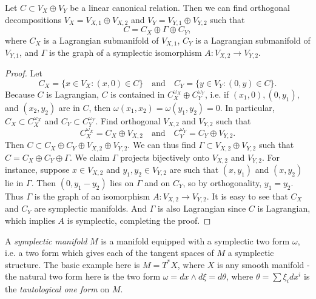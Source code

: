 \begin{lemma}
    Let $C \subset V_X \oplus V_Y$ be a linear canonical relation. Then we can find orthogonal decompositions $V_X = V_{X,1} \oplus V_{X,2}$ and $V_Y = V_{Y,1} \oplus V_{Y,2}$ such that
    \[ C = C_X \oplus \Gamma \oplus C_Y, \]
    where $C_X$ is a Lagrangian submanifold of $V_{X,1}$, $C_Y$ is a Lagrangian submanifold of $V_{Y,1}$, and $\Gamma$ is the graph of a symplectic isomorphism $A: V_{X,2} \to V_{Y,2}$.
\end{lemma}
\begin{proof}
    Let
    \[ C_X = \{ x \in V_X : (x,0) \in C \} \quad\text{and}\quad C_Y = \{ y \in V_Y : (0,y) \in C \}. \]
    Because $C$ is Lagrangian, $C$ is contained in $C_X^{\omega_X} \oplus C_Y^{\omega_Y}$, i.e. if $(x_1,0), (0,y_1)$, and $(x_2,y_2)$ are in $C$, then $\omega(x_1,x_2) = \omega(y_1,y_2) = 0$. In particular, $C_X \subset C_X^{\omega_X}$ and $C_Y \subset C_Y^{\omega_Y}$. Find orthogonal $V_{X,2}$ and $V_{Y,2}$ such that
    \[ C_X^{\omega_X} = C_X \oplus V_{X,2} \quad\text{and}\quad C_Y^{\omega_Y} = C_Y \oplus V_{Y,2}. \]
    Then $C \subset C_X \oplus C_Y \oplus V_{X,2} \oplus V_{Y,2}$. We can thus find $\Gamma \subset V_{X,2} \oplus V_{Y,2}$ such that $C = C_X \oplus C_Y \oplus \Gamma$. We claim $\Gamma$ projects bijectively onto $V_{X,2}$ and $V_{Y,2}$. For instance, suppose $x \in V_{X,2}$ and $y_1,y_2 \in V_{Y,2}$ are such that $(x,y_1)$ and $(x,y_2)$ lie in $\Gamma$. Then $(0,y_1 - y_2)$ lies on $\Gamma$ and on $C_Y$, so by orthogonality, $y_1 = y_2$. Thus $\Gamma$ is the graph of an isomorphism $A:V_{X,2} \to V_{Y,2}$. It is easy to see that $C_X$ and $C_Y$ are symplectic manifolds. And $\Gamma$ is also Lagrangian since $C$ is Lagrangian, which implies $A$ is symplectic, completing the proof.
\end{proof}

A \emph{symplectic manifold} $M$ is a manifold equipped with a symplectic two form $\omega$, i.e. a two form which gives each of the tangent spaces of $M$ a symplectic structure. The basic example here is $M = T^* X$, where $X$ is any smooth manifold - the natural two form here is the two form $\omega = dx \wedge d\xi = d \theta$, where $\theta = \sum \xi_i dx^i$ is the \emph{tautological one form} on $M$.

